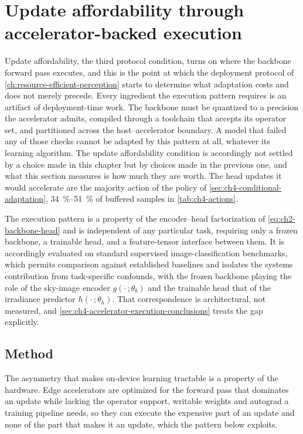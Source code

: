 \section{Update affordability through accelerator-backed execution}
\label{sec:ch4-accelerator-execution}
Update affordability, the third protocol condition, turns on where the backbone forward pass executes, and this is the point at which the deployment protocol of \cref{ch:resource-efficient-perception} starts to determine what adaptation costs and does not merely precede. Every ingredient the execution pattern requires is an artifact of deployment-time work. The backbone must be quantized to a precision the accelerator admits, compiled through a toolchain that accepts its operator set, and partitioned across the host--accelerator boundary. A model that failed any of those checks cannot be adapted by this pattern at all, whatever its learning algorithm. The update affordability condition is accordingly not settled by a choice made in this chapter but by choices made in the previous one, and what this section measures is how much they are worth. The head updates it would accelerate are the majority action of the policy of \cref{sec:ch4-conditional-adaptation}, \SIrange{34}{51}{\percent} of buffered samples in \cref{tab:ch4-actions}.

The execution pattern is a property of the encoder--head factorization of \cref{eq:ch2-backbone-head} and is independent of any particular task, requiring only a frozen backbone, a trainable head, and a feature-tensor interface between them. It is accordingly evaluated on standard supervised image-classification benchmarks, which permits comparison against established baselines and isolates the systems contribution from task-specific confounds, with the frozen backbone playing the role of the sky-image encoder $g(\cdot\,;\theta_b)$ and the trainable head that of the irradiance predictor $h(\cdot\,;\theta_h)$. That correspondence is architectural, not measured, and \cref{sec:ch4-accelerator-execution-conclusions} treats the gap explicitly.

\subsection{Method}
\label{sec:ch4-accelerator-execution-method}
The asymmetry that makes on-device learning tractable is a property of the hardware. Edge accelerators are optimized for the forward pass that dominates an update while lacking the operator support, writable weights and autograd a training pipeline needs, so they can execute the expensive part of an update and none of the part that makes it an update, which the pattern below exploits.

